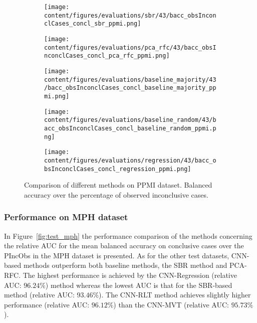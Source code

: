 \begin{figure}[ht]
  \begin{subfigure}{0.5\textwidth}
    \centering
    \texttt{[image: content/figures/evaluations/sbr/43/bacc\_obsInconclCases\_concl\_sbr\_ppmi.png]}
  \end{subfigure}
  \hfill
  \begin{subfigure}{0.5\textwidth}
    \centering
    \texttt{[image: content/figures/evaluations/pca\_rfc/43/bacc\_obsInconclCases\_concl\_pca\_rfc\_ppmi.png]}
  \end{subfigure}
  \hfill
  \begin{subfigure}{0.5\textwidth}
    \centering
    \texttt{[image: content/figures/evaluations/baseline\_majority/43/bacc\_obsInconclCases\_concl\_baseline\_majority\_ppmi.png]}
  \end{subfigure}
  \hfill
  \begin{subfigure}{0.5\textwidth}
    \centering
    \texttt{[image: content/figures/evaluations/baseline\_random/43/bacc\_obsInconclCases\_concl\_baseline\_random\_ppmi.png]}
  \end{subfigure}
  \hfill
  \begin{subfigure}{0.5\textwidth}
    \centering
    \texttt{[image: content/figures/evaluations/regression/43/bacc\_obsInconclCases\_concl\_regression\_ppmi.png]}
  \end{subfigure}

  \caption{Comparison of different methods on PPMI dataset. 
  Balanced accuracy over the percentage of observed inconclusive cases.}
  \label{fig:test_ppmi}
\end{figure}



\subsubsection{Performance on MPH dataset}

In Figure~\ref{fig:test_mph} the performance comparison of the methods 
concerning the relative AUC for the mean balanced accuracy on conclusive cases over the PIncObs 
in the MPH dataset is presented.
As for the other test datasets, CNN-based methods outperform both baseline methods, the SBR method and PCA-RFC.
The highest performance is achieved by the CNN-Regression (relative AUC: $96.24\%$) method 
whereas the lowest AUC is that for the SBR-based method (relative AUC: $93.46\%$).
The CNN-RLT method achieves slightly higher performance (relative AUC: $96.12\%$) 
than the CNN-MVT (relative AUC: $95.73\%$).



